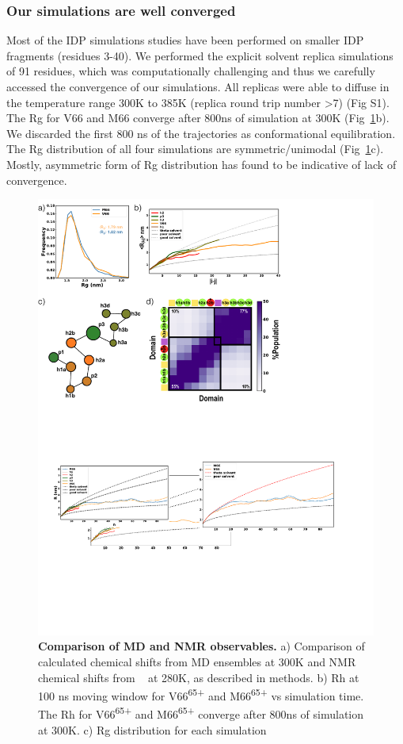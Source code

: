 \documentclass[10pt,letterpaper]{article}
\begin{document}
\subsubsection*{Our simulations are well converged} 

Most of the IDP simulations studies have been performed on smaller IDP fragments (residues 3-40). We performed the explicit solvent replica simulations of 91 residues, which was computationally challenging and thus we carefully accessed the convergence of our simulations. All replicas were able to diffuse in the temperature range 300K to 385K (replica round trip number \textgreater 7) (Fig S1). The Rg for V66 and M66 converge after 800ns of simulation at 300K (Fig~\ref{fig3}b). We discarded the first 800 ns of the trajectories as conformational equilibration. The Rg distribution of all four simulations are symmetric/unimodal (Fig~\ref{fig3}c). Mostly, asymmetric form of Rg distribution has found to be indicative of lack of convergence. 

\begin{figure}[!ht]
\includegraphics[scale=0.5,width=\textwidth,trim={0 0cm 0 0cm},clip]{../figures/fig3.pdf}
\caption{{\bf Comparison of MD and NMR observables.} a) Comparison of calculated chemical shifts from MD ensembles at 300K and NMR chemical shifts from ~\cite{Anastasia2013}  at 280K,  as described in methods. b) Rh at 100 ns moving  window for V66\textsuperscript{65+} and M66\textsuperscript{65+} vs simulation time. The Rh for V66\textsuperscript{65+} and M66\textsuperscript{65+} converge after 800ns of simulation at 300K. c) Rg distribution for each simulation }
\label{fig3} 
\end{figure}
\end{document}
